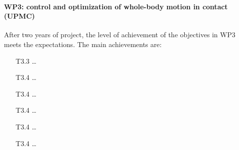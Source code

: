 

 
\paragraph*{WP3: control and optimization of whole-body motion in contact (UPMC)}

After two years of project, the level of achievement of the objectives in WP3 meets the expectations. The main achievements are:
\begin{itemize}
\item[T3.3]  \dots 

\item[T3.4]  \dots 

\item[T3.4]  \dots 

\item[T3.4]  \dots 

\item[T3.4]  \dots 

\item[T3.4]  \dots 
\end{itemize}

